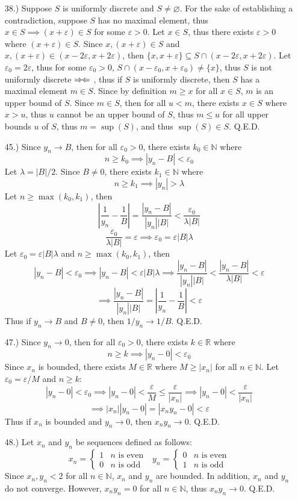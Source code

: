 \documentclass[12pt]{article}
\newcommand{\contradiction}{
    \ensuremath{{\Rightarrow\mspace{-2mu}\Leftarrow}}
}
\newcommand{\vertb}[1]{\left\vert#1\right\vert}
\newcommand{\e}{\varepsilon}
\begin{document}
\begin{itemize}
    \pagebreak
    \item [38.)] Suppose $S$ is uniformly discrete and $S\ne\varnothing$. For the sake of establishing a contradiction, suppose $S$ has no maximal element, thus $x\in S\implies(x+\e)\in S$ for some $\e>0$. Let $x\in S$, thus there exists $\e>0$ where $(x+\e)\in S$. Since $x,(x+\e)\in S$ and $x,(x+\e)\in(x-2\e,x+2\e)$, then $\{x,x+\e\}\subseteq S\cap(x-2\e,x+2\e)$. Let $\e_0=2\e$, thus for some $\e_0>0$, $S\cap(x-\e_0,x+\e_0)\ne\{x\}$, thus $S$ is not uniformly discrete\contradiction, thus if $S$ is uniformly discrete, then $S$ has a maximal element $m\in S$. Since by definition $m\geq x$ for all $x\in S$, $m$ is an upper bound of $S$. Since $m\in S$, then for all $u<m$, there exists $x\in S$ where $x>u$, thus $u$ cannot be an upper bound of $S$, thus $m\leq u$ for all upper bounds $u$ of $S$, thus $m=\sup(S)$, and thus $\sup(S)\in S$. Q.E.D.

    \item [45.)] Since $y_n\to B$, then for all $\e_0>0$, there exists $k_0\in\mathbb{N}$ where
    \[n\geq k_0\implies\vertb{y_n-B}<\e_0\]
    Let $\lambda=\vertb{B}/2$. Since $B\neq0$, there exists $k_1\in\mathbb{N}$ where
    \[n\geq k_1\implies\vertb{y_n}>\lambda\]
    Let $n\geq\max(k_0,k_1)$, then
    \[\vertb{\frac{1}{y_n}-\frac{1}{B}}=\frac{\vertb{y_n-B}}{\vertb{y_n}\vertb{B}}<\frac{\e_0}{\lambda\vertb{B}}\]
    \[\frac{\e_0}{\lambda\vertb{B}}=\e\implies\e_0=\e\vertb{B}\lambda\]
    Let $\e_0=\e\vertb{B}\lambda$ and $n\geq\max(k_0,k_1)$, then
    \[\vertb{y_n-B}<\e_0\implies\vertb{y_n-B}<\e\vertb{B}\lambda\implies \frac{\vertb{y_n-B}}{\vertb{y_n}\vertb{B}}<\frac{\vertb{y_n-B}}{\lambda\vertb{B}}<\e\]
    \[\implies\frac{\vertb{y_n-B}}{\vertb{y_n}\vertb{B}}=\vertb{\frac{1}{y_n}-\frac{1}{B}}<\e\]
    Thus if $y_n\to B$ and $B\neq0$, then $1/y_n\to1/B$. Q.E.D.

    \pagebreak
    \item [47.)] Since $y_n\to0$, then for all $\e_0>0$, there exists $k\in\mathbb{R}$ where
    \[n\geq k\implies\vertb{y_n-0}<\e_0\]
    Since $x_n$ is bounded, there exists $M\in\mathbb{R}$ where $M\geq\vertb{x_n}$ for all $n\in\mathbb{N}$. Let $\e_0=\e/M$ and $n\geq k$:
    \[\vertb{y_n-0}<\e_0\implies\vertb{y_n-0}<\frac{\e}{M}\leq\frac{\e}{\vertb{x_n}}\implies\vertb{y_n-0}<\frac{\e}{\vertb{x_n}}\]
    \[\implies\vertb{x_n}\vertb{y_n-0}=\vertb{x_ny_n-0}<\e\]
    Thus if $x_n$ is bounded and $y_n\to0$, then $x_ny_n\to0$. Q.E.D.

    \item [48.)] Let $x_n$ and $y_n$ be sequences defined as follows:
    \[x_n=\begin{cases}
        1 & n\text{ is even}\\
        0 & n\text{ is odd}
    \end{cases}\ \ \ y_n=\begin{cases}
        0 & n\text{ is even}\\
        1 & n\text{ is odd}
    \end{cases}\]
    Since $x_n,y_n<2$ for all $n\in\mathbb{N}$, $x_n$ and $y_n$ are bounded. In addition, $x_n$ and $y_n$ do not converge. However, $x_ny_n=0$ for all $n\in\mathbb N$, thus $x_ny_n\to0$. Q.E.D.


\end{itemize}
\end{document}
